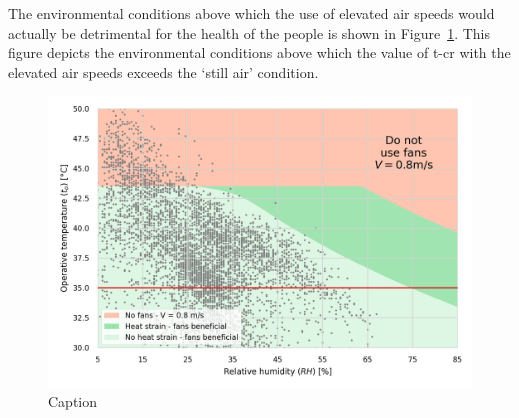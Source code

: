 The environmental conditions above which the use of elevated air speeds would actually be detrimental for the health of the people is shown in Figure~\ref{fig:energy_storage_delta}.
This figure depicts the environmental conditions above which the value of \ac{t-cr} with the elevated air speeds exceeds the `still air' condition.


\begin{figure}[b!]
    \centering
    \includegraphics[width=\textwidth]{figures/use_fans.png}
    \caption{Caption}
    \label{fig:energy_storage_delta}
\end{figure}


